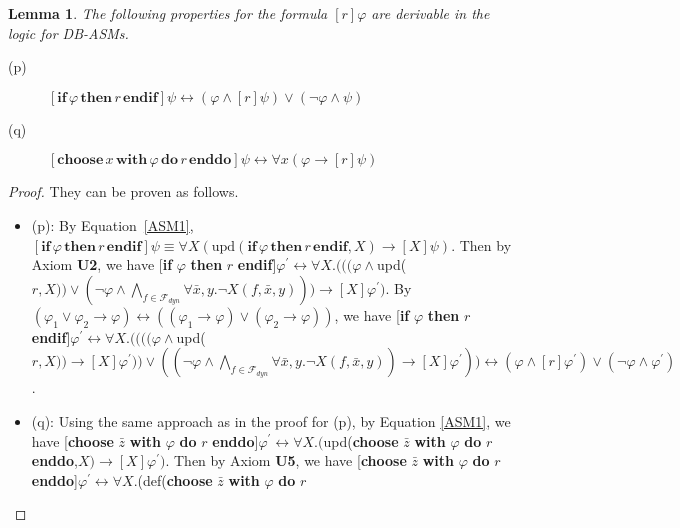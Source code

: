 \documentclass[preprint,11pt]{elsarticle}
\newtheorem{lemma}[theorem]{Lemma}
\theoremstyle{definition}
\theoremstyle{remark}
\begin{document}
\begin{lemma}\label{lem-soundness-rule}The following properties for the formula $[r]\varphi$ are derivable in the logic for DB-ASMs.
\begin{description}
  \item[(p)] $[\textbf{if} \, \varphi \, \textbf{then} \, r \, \textbf{endif}]\psi \leftrightarrow (\varphi\wedge[r]\psi) \vee (\neg \varphi \wedge \psi)$\smallskip
  \item[(q)] $[\textbf{choose} \, x \, \textbf{with} \, \varphi \, \textbf{do} \, r \, \textbf{enddo}]\psi \leftrightarrow \forall x (\varphi\rightarrow [r]\psi)$\smallskip
\end{description}
\end{lemma}
\iffalse
\begin{proof} They can be proven as follows.
\begin{itemize}
  \item (p): By Equation~\ref{ASM1}, $[\textbf{if} \, \varphi \, \textbf{then} \, r \, \textbf{endif}]\psi \equiv \forall X (\mathrm{upd}(\textbf{if} \, \varphi \, \textbf{then} \, r \, \textbf{endif},X) \rightarrow [X]\psi)$. Then by Axiom
  \textbf{U2}, we have [\textbf{if} $\varphi$ \textbf{then} $r$
  \textbf{endif}]$\varphi^{\prime}\leftrightarrow \forall X.(((\varphi\wedge$upd($r,X))\vee (\neg\varphi\wedge \bigwedge\limits_{f\in \mathcal{F}_{dyn}}\forall
  \bar{x},y.\neg X(f,\bar{x},y)))\rightarrow[X]\varphi^{\prime})$.
  By $(\varphi_1\vee\varphi_2\rightarrow \varphi)\leftrightarrow ((\varphi_1\rightarrow\varphi)\vee(\varphi_2\rightarrow
  \varphi))$, we have [\textbf{if} $\varphi$ \textbf{then} $r$
  \textbf{endif}]$\varphi^{\prime}\leftrightarrow \forall X.((((\varphi\wedge$upd($r,X))\rightarrow[X]\varphi^{\prime}))\vee ((\neg\varphi\wedge \bigwedge\limits_{f\in \mathcal{F}_{dyn}}\forall
  \bar{x},y.\neg X(f,\bar{x},y))\rightarrow[X]\varphi^{\prime}))\leftrightarrow (\varphi\wedge[r]\varphi^{\prime})\vee (\neg\varphi\wedge
  \varphi^{\prime})$.
  \item (q): Using the same approach as in the
  proof for (p), by Equation \ref{ASM1}, we have [\textbf{choose} $\bar{z}$ \textbf{with} $\varphi$ \textbf{do} $r$
  \textbf{enddo}]$\varphi^{\prime}\leftrightarrow \forall X.($upd(\textbf{choose} $\bar{z}$ \textbf{with} $\varphi$ \textbf{do} $r$
  \textbf{enddo},$X)\rightarrow[X]\varphi^{\prime})$. Then by Axiom
  \textbf{U5}, we have [\textbf{choose} $\bar{z}$ \textbf{with} $\varphi$ \textbf{do} $r$
  \textbf{enddo}]$\varphi^{\prime}\leftrightarrow \forall X.$(def(\textbf{choose}
$\bar{z}$ \textbf{with} $\varphi$ \textbf{do} $r$

\end{itemize}
\end{proof}
\end{document}
